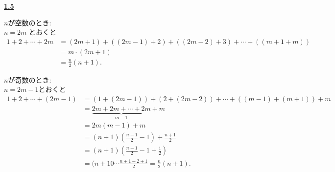 \documentclass{jarticle}
\newcommand{\cnt}[1]{\noindent \underline{\textbf{#1}}}
\begin{document}
\cnt{1.5} %

\noindent $n$が空数のとき: \\
$n = 2m$ とおくと
\begin{align*}
1 + 2 + \cdots + 2m
  &= (2m + 1) + ((2m - 1) + 2) + ((2m - 2) + 3) + \cdots + ((m + 1 + m)) \\
  &= m \cdot (2m+1) \\
  &= \frac{n}{2}(n+1).
\end{align*}

\noindent $n$が奇数のとき: \\
$n = 2m - 1$とおくと
\begin{align*}
1 + 2 + \cdots + (2m - 1)
  &= (1 + (2m - 1)) + (2 + (2m - 2)) + \cdots + ((m - 1) + (m + 1)) + m \\
  &= \underbrace{2m + 2m + \cdots + 2m}_{m-1} + m \\
  &= 2m(m-1) + m \\
  &= (n+1)(\frac{n+1}{2} - 1) + \frac{n+1}{2} \\
  &= (n+1)(\frac{n+1}{2} - 1 + \frac{1}{2}) \\
  &= (n+10 \cdots \frac{n+1 - 2 + 1}{2} = \frac{n}{2}(n+1).
\end{align*}



\end{document}
